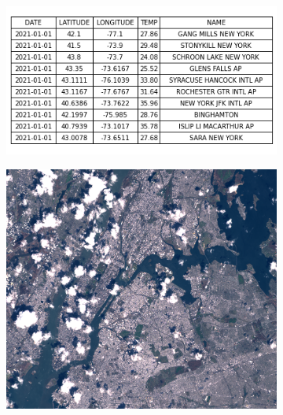 \documentclass[../main.tex]{subfiles}
\begin{document}
\begin{figure}[H]
    \begin{subfigure}{.3\textwidth}
        \includegraphics[width=1\textwidth]{figures/intro/table.png}
    \end{subfigure}
    \begin{subfigure}{.3\textwidth}
        \includegraphics[width=1\textwidth]{figures/intro/landsat.png}
    \end{subfigure}
    \begin{subfigure}{.3\textwidth}

\end{subfigure}
\end{figure}
\end{document}
